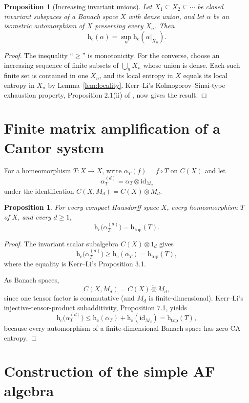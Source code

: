 \documentclass[11pt]{article}
\newtheorem{proposition}[theorem]{Proposition}
\theoremstyle{remark}
\newcommand{\hc}{\mathrm{h}_{\mathrm c}}
\newcommand{\htop}{\mathrm{h}_{\mathrm{top}}}
\newcommand{\id}{\mathrm{id}}
\newcommand{\injtensor}{\mathbin{\check\otimes}}
\begin{document}
\begin{proposition}[Increasing invariant unions]\label{prop:union}
Let $X_1\subseteq X_2\subseteq\cdots$ be closed invariant subspaces of a
Banach space $X$ with dense union, and let $\alpha$ be an isometric
automorphism of $X$ preserving every $X_n$.  Then
\[
  \hc(\alpha)=\sup_n \hc(\alpha|_{X_n}).
\]
\end{proposition}

\begin{proof}
The inequality ``$\geq$'' is monotonicity.  For the converse, choose an
increasing sequence of finite subsets of $\bigcup_nX_n$ whose union is
dense.  Each such finite set is contained in one $X_n$, and its local
entropy in $X$ equals its local entropy in $X_n$ by
Lemma~\ref{lem:locality}.  Kerr--Li's Kolmogorov--Sinai-type exhaustion
property, Proposition 2.1(ii) of \cite{KerrLi}, now gives the result.
\end{proof}

\section{Finite matrix amplification of a Cantor system}

For a homeomorphism $T\colon X\to X$, write
$\alpha_T(f)=f\circ T$ on $C(X)$ and let
\[
  \alpha_T^{(d)}=\alpha_T\otimes\id_{M_d}
\]
under the identification $C(X,M_d)=C(X)\otimes M_d$.

\begin{proposition}\label{prop:matrix-amplification}
For every compact Hausdorff space $X$, every homeomorphism $T$ of $X$, and
every $d\geq1$,
\[
  \hc\bigl(\alpha_T^{(d)}\bigr)=\htop(T).
\]
\end{proposition}

\begin{proof}
The invariant scalar subalgebra $C(X)\otimes 1_d$ gives
\[
  \hc\bigl(\alpha_T^{(d)}\bigr)
  \geq \hc(\alpha_T)=\htop(T),
\]
where the equality is Kerr--Li's Proposition 3.1.

As Banach spaces,
\[
  C(X,M_d)=C(X)\injtensor M_d,
\]
since one tensor factor is commutative (and $M_d$ is finite-dimensional).
Kerr--Li's injective-tensor-product subadditivity, Proposition 7.1, yields
\[
  \hc\bigl(\alpha_T^{(d)}\bigr)
  \leq \hc(\alpha_T)+\hc(\id_{M_d})
  =\htop(T),
\]
because every automorphism of a finite-dimensional Banach space has zero CA
entropy.
\end{proof}

\section{Construction of the simple AF algebra}
\end{document}
